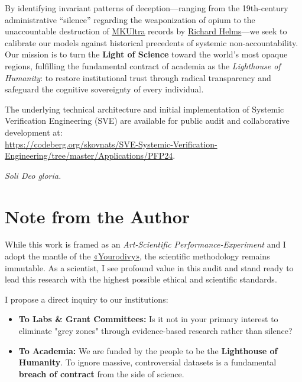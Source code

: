 \documentclass[11pt,a4paper]{article}
\theoremstyle{definition}
\theoremstyle{remark}
\begin{document}
By identifying invariant patterns of deception—ranging from the 19th-century administrative ``silence'' regarding the weaponization of opium to the unaccountable destruction of \href{https://en.wikipedia.org/wiki/MKUltra}{MKUltra} records by \href{https://en.wikipedia.org/wiki/Richard_Helms}{Richard Helms}—we seek to calibrate our models against historical precedents of systemic non-accountability. Our mission is to turn the \textbf{Light of Science} toward the world’s most opaque regions, fulfilling the fundamental contract of academia as the \textit{Lighthouse of Humanity}: to restore institutional trust through radical transparency and safeguard the cognitive sovereignty of every individual.

The underlying technical architecture and initial implementation of Systemic Verification Engineering (SVE) are available for public audit and collaborative development at: \\ \url{https://codeberg.org/skovnats/SVE-Systemic-Verification-Engineering/tree/master/Applications/PFP24}.

\vfill
\begin{center}
    \textit{Soli Deo gloria.}
\end{center}

\section*{Note from the Author}

While this work is framed as an \textit{Art-Scientific Performance-Experiment} and I adopt the mantle of the \href{https://en.wikipedia.org/wiki/Foolishness_for_Christ}{«Yourodivy»}, the scientific methodology remains immutable. As a scientist, I see profound value in this audit and stand ready to lead this research with the highest possible ethical and scientific standards. 

I propose a direct inquiry to our institutions:
\begin{itemize}
    \item \textbf{To Labs \& Grant Committees:} Is it not in your primary interest to eliminate "grey zones" through evidence-based research rather than silence?
    \item \textbf{To Academia:} We are funded by the people to be the \textbf{Lighthouse of Humanity}. To ignore massive, controversial datasets is a fundamental \textbf{breach of contract} from the side of science. 
\end{itemize}
\end{document}
